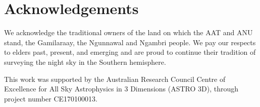 \documentclass[fleqn,usenatbib]{mnras}
\begin{document}


\section*{Acknowledgements}

We acknowledge the traditional owners of the land on which the AAT and ANU stand, the Gamilaraay, the Ngunnawal and Ngambri people. We pay our respects to elders past, present, and emerging and are proud to continue their tradition of surveying the night sky in the Southern hemisphere.

This work was supported by the Australian Research Council Centre of Excellence for All Sky Astrophysics in 3 Dimensions (ASTRO 3D), through project number CE170100013.
\end{document}
